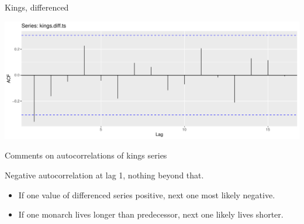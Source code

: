 \documentclass[
  ignorenonframetext,
]{beamer}
\newenvironment{Shaded}{\begin{snugshade}}{\end{snugshade}}
\newcommand{\DataTypeTok}[1]{\textcolor[rgb]{0.13,0.29,0.53}{#1}}
\newcommand{\KeywordTok}[1]{\textcolor[rgb]{0.13,0.29,0.53}{\textbf{#1}}}
\newcommand{\NormalTok}[1]{#1}
\newcommand{\OperatorTok}[1]{\textcolor[rgb]{0.81,0.36,0.00}{\textbf{#1}}}
\newcommand{\StringTok}[1]{\textcolor[rgb]{0.31,0.60,0.02}{#1}}
\providecommand{\tightlist}{%
  \setlength{\itemsep}{0pt}\setlength{\parskip}{0pt}}
\begin{document}
\begin{frame}[fragile]{Kings, differenced}
\protect\hypertarget{kings-differenced}{}

\begin{Shaded}
\end{Shaded}

\includegraphics{slides_d29_files/figure-beamer/unnamed-chunk-540-1.pdf}

\end{frame}

\begin{frame}{Comments on autocorrelations of kings series}
\protect\hypertarget{comments-on-autocorrelations-of-kings-series}{}

Negative autocorrelation at lag 1, nothing beyond that.

\begin{itemize}
\tightlist
\item
  If one value of differenced series positive, next one most likely
  negative.
\item
  If one monarch lives longer than predecessor, next one likely lives
  shorter.
\end{itemize}

\end{frame}
\end{document}

